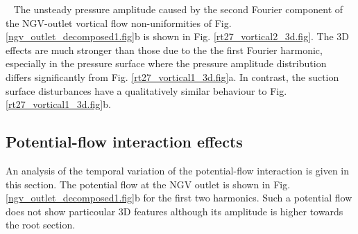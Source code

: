 ~\newline
 The unsteady pressure amplitude caused by the second Fourier
 component of the NGV-outlet vortical flow non-uniformities of
 Fig. \ref{ngv_outlet_decomposed1.fig}b is shown in
 Fig. \ref{rt27_vortical2_3d.fig}.
 The 3D effects are much stronger than those due to
 the the first Fourier harmonic,
 especially in the pressure surface where the
 pressure amplitude distribution differs significantly from
 Fig. \ref{rt27_vortical1_3d.fig}a. In contrast, the suction
 surface disturbances have a qualitatively similar behaviour to
 Fig. \ref{rt27_vortical1_3d.fig}b.
%
%
%
%
%
\subsection{Potential-flow interaction effects}
\label{rt27_potential.subsec}
%
 An analysis of the temporal variation of
 the potential-flow interaction is given in this section.
 The potential flow at the NGV outlet is shown in
 Fig. \ref{ngv_outlet_decomposed1.fig}b for the first two harmonics.
 Such a potential flow does not show particoular 3D
 features although its amplitude is higher
 towards the root section.
%
